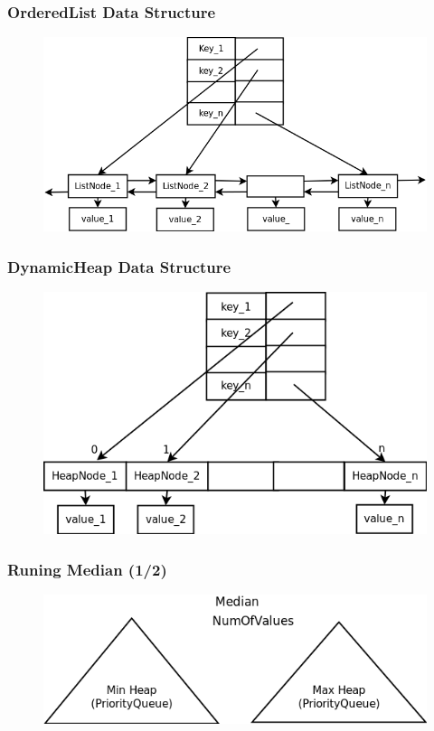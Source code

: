 \documentclass{beamer}
\begin{document}
\begin{frame}
\frametitle{OrderedList Data Structure}

\begin{figure}
        \includegraphics[width=0.8\linewidth]{orderedlist.png}
\end{figure}

\end{frame}

\begin{frame}
\frametitle{DynamicHeap Data Structure}

\begin{figure}
        \includegraphics[width=0.8\linewidth]{DinamicHeap.png}
\end{figure}

\end{frame}

\begin{frame}
\frametitle{Runing Median (1/2)}

\begin{figure}
        \includegraphics[width=0.8\linewidth]{runningmediang.png}
\end{figure}

\end{frame}
\end{document}

